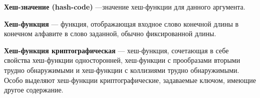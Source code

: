 \textbf{Хеш-значение (hash-code)} —значение хеш-функции для данного аргумента.

\textbf{Хеш-функция} — функция, отображающая входное слово конечной длины в конечном алфавите в слово заданной, обычно фиксированной длины.

\textbf{Хеш-функция криптографическая}  — хеш-функция, сочетающая в себе свойства хеш-функции односторонней, хеш-функции с прообразами вторыми трудно обнаружимыми и хеш-функции с коллизиями трудно обнаружимыми. Особо выделяют хеш-функции криптографические, задаваемые ключом, имеющие другое содержание.

\clearpage
